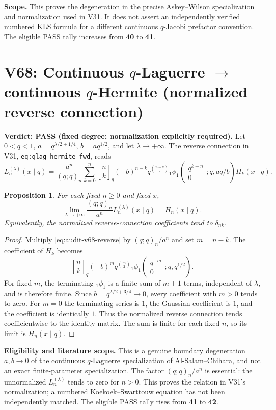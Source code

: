 \documentclass[11pt]{article}
\newtheorem{proposition}{Proposition}
\begin{document}
\noindent\textbf{Scope.} This proves the degeneration in the precise
Askey--Wilson specialization and normalization used in V31. It does not
assert an independently verified numbered KLS formula for a different
continuous $q$-Jacobi prefactor convention. The eligible PASS tally
increases from \textbf{40} to \textbf{41}.


\section{V68: Continuous $q$-Laguerre $\to$ continuous $q$-Hermite (normalized reverse connection)}
\noindent\textbf{Verdict: PASS (fixed degree; normalization explicitly required).}
Let $0<q<1$, $a=q^{\lambda/2+1/4}$, $b=aq^{1/2}$, and let $\lambda\to+\infty$.
The reverse connection in V31, \texttt{eq:qlag-hermite-fwd}, reads
\begin{equation}\label{eq:audit-v68-reverse}
 L_n^{(\lambda)}(x\mid q)=\frac{a^n}{(q;q)_n}
 \sum_{k=0}^n {n\brack k}_q(-b)^{n-k}q^{\binom{n-k}{2}}
 {}_1\phi_1\!\left(\begin{matrix}q^{k-n}\\0\end{matrix};q,aq/b\right)H_k(x\mid q).
\end{equation}
\begin{proposition}
For each fixed $n\ge0$ and fixed $x$,
\begin{equation}\label{eq:audit-v68-limit}
 \lim_{\lambda\to+\infty}\frac{(q;q)_n}{a^n}L_n^{(\lambda)}(x\mid q)=H_n(x\mid q).
\end{equation}
Equivalently, the normalized reverse-connection coefficients tend to $\delta_{nk}$.
\end{proposition}
\begin{proof}
Multiply \eqref{eq:audit-v68-reverse} by $(q;q)_n/a^n$ and set $m=n-k$.
The coefficient of $H_k$ becomes
\[
 {n\brack k}_q(-b)^m q^{\binom m2}
 {}_1\phi_1\!\left(\begin{matrix}q^{-m}\\0\end{matrix};q,q^{1/2}\right).
\]
For fixed $m$, the terminating ${}_1\phi_1$ is a finite sum of $m+1$
terms, independent of $\lambda$, and is therefore finite.  Since
$b=q^{\lambda/2+3/4}\to0$, every coefficient with $m>0$ tends to zero.
For $m=0$ the terminating series is $1$, the Gaussian coefficient is $1$,
and the coefficient is identically $1$. Thus the normalized reverse
connection tends coefficientwise to the identity matrix.  The sum is
finite for each fixed $n$, so its limit is $H_n(x\mid q)$.
\end{proof}
\noindent\textbf{Eligibility and literature scope.} This is a genuine
boundary degeneration $a,b\to0$ of the continuous $q$-Laguerre
specialization of Al-Salam--Chihara, and not an exact finite-parameter
specialization. The factor $(q;q)_n/a^n$ is essential: the unnormalized
$L_n^{(\lambda)}$ tends to zero for $n>0$. This proves the relation in
V31's normalization; a numbered Koekoek--Swarttouw equation has not been
independently matched. The eligible PASS tally rises from \textbf{41} to
\textbf{42}.
\end{document}
